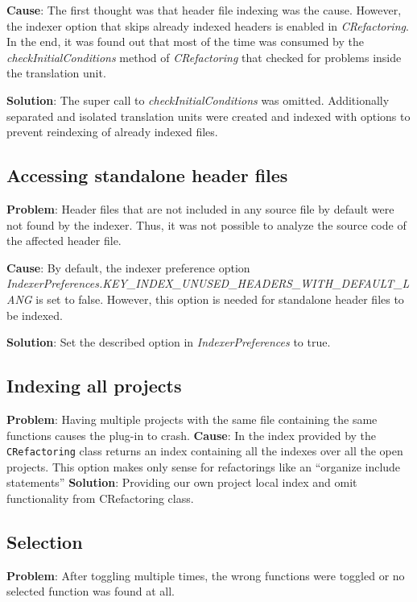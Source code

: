 \textbf{Cause}: The first thought was that header file indexing was the cause. 
However, the indexer option that skips already indexed headers is enabled in 
\textit{CRefactoring}. In the end, it was found out that most of the time was 
consumed by the \textit{checkInitialConditions} method of \textit{CRefactoring} 
that checked for problems inside the translation unit.

\textbf{Solution}: The super call to \textit{checkInitialConditions} was
omitted. Additionally separated and isolated translation units were created and
indexed with options to prevent reindexing of already indexed files.

\subsection{Accessing standalone header files}
\textbf{Problem}: Header files that are not included in any source file by 
default were not found by the indexer. Thus, it was not possible to analyze the 
source code of the affected header file.

\textbf{Cause}: By default, the indexer preference option 
\textit{IndexerPreferences.KEY\_INDEX\_UNUSED\_HEADERS\_WITH\_DEFAULT\_LANG} is 
set to false. However, this option is needed for standalone header files to be 
indexed.

\textbf{Solution}: Set the described option in \textit{IndexerPreferences} to 
true.

\subsection{Indexing all projects}

\textbf{Problem}: Having multiple projects with the same file containing the
same functions causes the plug-in to crash. 
\textbf{Cause}: In the index provided by the \texttt{CRefactoring} class
returns an index containing all the indexes over all the open projects. This
option makes only sense for refactorings like an ``organize include statements''
\textbf{Solution}: Providing our own project local index and omit functionality
from CRefactoring class.

\subsection{Selection}
\textbf{Problem}: After toggling multiple times, the wrong functions were 
toggled or no selected function was found at all. 

